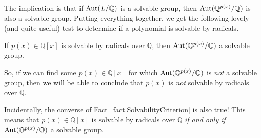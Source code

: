 The implication is that if $\operatorname{Aut}(L/\mathbb{Q})$ is a solvable group, then $\operatorname{Aut}(\mathbb{Q}^{p(x)}/\mathbb{Q})$ is also a solvable group. Putting everything together, we get the following lovely (and quite useful) test to determine if a polynomial is solvable by radicals. 

\begin{fact}\label{fact.SolvabilityCriterion}
If $p(x)\in \mathbb{Q}[x]$ is solvable by radicals over $\mathbb{Q}$, then $\operatorname{Aut}(\mathbb{Q}^{p(x)}/\mathbb{Q})$ a solvable group.
\end{fact}

So, if we can find some $p(x)\in \mathbb{Q}[x]$ for which $\operatorname{Aut}(\mathbb{Q}^{p(x)}/\mathbb{Q})$ is \emph{not} a solvable group, then we will be able to conclude that 
$p(x)$ is \emph{not} solvable by radicals over $\mathbb{Q}$.

Incidentally, the converse of Fact~\ref{fact.SolvabilityCriterion} is also true! This means that $p(x)\in \mathbb{Q}[x]$ is solvable by radicals over $\mathbb{Q}$ \emph{if and only if} $\operatorname{Aut}(\mathbb{Q}^{p(x)}/\mathbb{Q})$ a solvable group.











